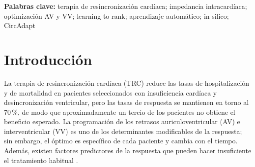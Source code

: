 \documentclass[11pt,a4paper]{article}
\begin{document}
\begin{abstract}
\textbf{Resultados.} El modelo de ordenación lineal seleccionó un ajuste casi
óptimo (dentro del 2\,\%) en el 64.0\,\% de los pacientes de prueba en el dominio
de origen (pérdida media 1.8\,\%) y en el 64.0\,\% bajo el desplazamiento del
sensor. Con la tolerancia del 5\,\%, estos valores fueron 88.0\,\% y 86.7\,\%.
El modelo de ordenación lineal combinado con los \emph{embeddings} de la CNN
alcanzó el 80.0\,\% al 2\,\% (pérdida 1.09\,\%) en el dominio de origen y el
94.7\,\% al 5\,\%; bajo el desplazamiento del sensor, los valores fueron
68.0\,\% al 2\,\% y 89.3\,\% al 5\,\%. Una mezcla ponderada por validación
seleccionó ese mismo modelo (80.0\,\%/68.0\,\% al 2\,\%;
94.7\,\%/89.3\,\% al 5\,\%). Un modelo sin características de la onda (contexto y
programación) alcanzó el 49.3\,\% al 2\,\% y el 68.0\,\% al 5\,\% en ambos
dominios, mientras que un control negativo con etiquetas permutadas se redujo al
8.0\,\%.

\textbf{Conclusiones.} La simulación indica que la impedancia intracardíaca
contiene información útil para los modelos de ordenación simples. A juicio del
autor, esto justificaría una prueba piloto con pacientes reales, dada la
facilidad para integrar el software en el hardware existente, que en general ya
registra la impedancia intracardíaca.
\end{abstract}

\vspace{0.5em}
\noindent\textbf{Palabras clave:} terapia de resincronización cardíaca;
impedancia intracardíaca; optimización AV y VV; learning-to-rank; aprendizaje automático; in silico; CircAdapt

\section{Introducción}

La terapia de resincronización cardíaca (TRC) reduce las tasas de hospitalización
y de mortalidad en pacientes seleccionados con insuficiencia cardíaca y
desincronización ventricular, pero las tasas de respuesta se mantienen en torno
al 70\,\%, de modo que aproximadamente un tercio de los pacientes no obtiene el
beneficio esperado. La programación de los retrasos auriculoventricular (AV) e
interventricular (VV) es uno de los determinantes modificables de la respuesta;
sin embargo, el óptimo es específico de cada paciente y cambia con el tiempo.
Además, existen factores predictores de la respuesta que pueden hacer
insuficiente el tratamiento habitual \citep{aalen2020}.
\end{document}
